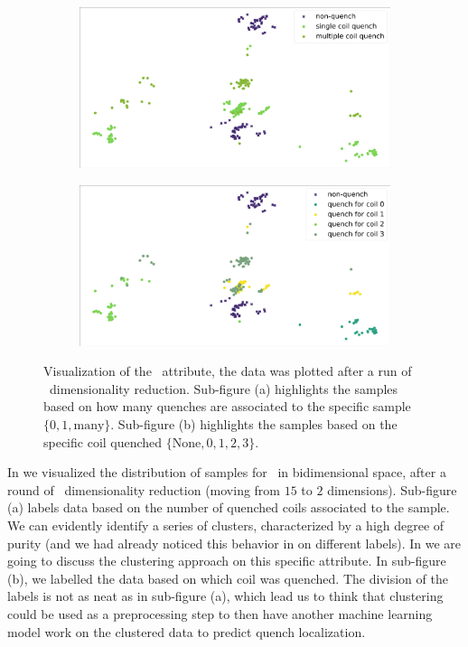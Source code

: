 \begin{figure}[!ht]
	\centering
	\begin{subfigure}{0.6\linewidth}
		\centering
		\includegraphics[width=\linewidth]{img/quench_dist_qlp/single_vs_multiple_An.png}
		\subcaption{}
	\end{subfigure}
	\begin{subfigure}{0.6\linewidth}
		\centering
		\includegraphics[width=\linewidth]{img/quench_dist_qlp_an.png}
		\subcaption{}
	\end{subfigure}
	\caption{Visualization of the \an\ attribute, the data was plotted after a run of \pca\
		dimensionality reduction. Sub-figure (a) highlights the samples based on how many quenches
		are associated to the specific sample $\{0, 1, \text{many}\}$. Sub-figure (b) highlights the
		samples based on the specific coil quenched $\{\text{None}, 0, 1, 2, 3\}$.}\label{fig:an-coilq-dist}
\end{figure}

In  we visualized the distribution of samples for \an\ in
bidimensional space, after a round of \pca\ dimensionality reduction (moving from $15$ to $2$
dimensions). Sub-figure (a) labels data based on the number of quenched coils associated to the
sample. We can evidently identify a series of clusters, characterized by a high degree of purity
(and we had already noticed this behavior in \Cref{sec:an} on different labels). In
\Cref{sec:qlp-cluster} we are going to discuss the clustering approach on this specific attribute.
In sub-figure (b), we labelled the data based on which coil was quenched. The division of the labels
is not as neat as in sub-figure (a), which lead us to think that clustering could be used as a
preprocessing step to then have another machine learning model work on the clustered data to predict
quench localization.

